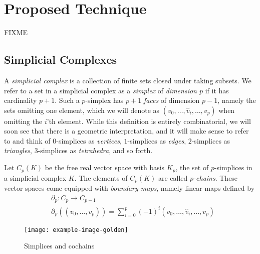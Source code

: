 \section{Proposed Technique}
FIXME

\subsection{Simplicial  Complexes}
A \emph{simplicial complex} is a collection of finite sets closed under taking subsets. We refer to a set in a simplicial complex as a \emph{simplex} of \emph{dimension $p$} if it has cardinality $p+1$. Such a $p$-simplex has $p+1$ \emph{faces} of dimension $p-1$, namely the sets omitting one element, which we will denote as $(v_0,\dotsc,\hat{v}_i,\dotsc, v_p)$ when omitting the $i$'th element. While this definition is entirely combinatorial, we will soon see that there is a geometric interpretation, and it will make sense to refer to and think of $0$-simplices as \emph{vertices}, $1$-simplices as \emph{edges}, $2$-simplices as \emph{triangles}, $3$-simplices as \emph{tetrahedra}, and so forth.

Let $C_p(K)$ be the free real vector space with basis $K_p$, the set of $p$-simplices in a simplicial complex $K$. The elements of $C_p(K)$ are called \emph{$p$-chains}. These vector spaces come equipped with \emph{boundary maps}, namely linear maps defined by
\begin{align*}
  &\partial_p:C_p\to C_{p-1} \\
  &\partial_p((v_0,\dotsc,v_p)) = \sum_{i=0}^p (-1)^i(v_0,\dotsc,\hat{v}_i,\dotsc,v_p)
\end{align*}

\begin{figure}[htbp]
  \centering
  
\texttt{[image: example-image-golden]}
  \caption{Simplices and cochains} \label{fig:cochains}
\end{figure}


